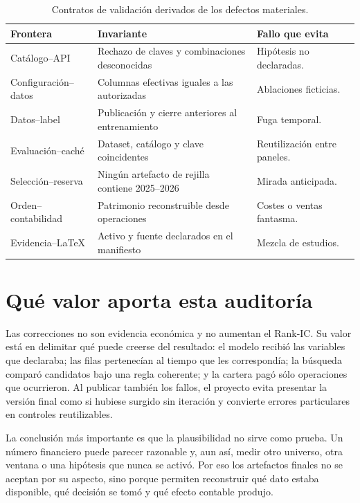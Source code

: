 \begin{table}[H]
  \centering
  \small
  \begin{tabularx}{\textwidth}{p{3.0cm}X X}
    \toprule
    Frontera & Invariante & Fallo que evita \\
    \midrule
    Catálogo--API & Rechazo de claves y combinaciones desconocidas & Hipótesis no declaradas. \\
    Configuración--datos & Columnas efectivas iguales a las autorizadas & Ablaciones ficticias. \\
    Datos--label & Publicación y cierre anteriores al entrenamiento & Fuga temporal. \\
    Evaluación--caché & Dataset, catálogo y clave coincidentes & Reutilización entre paneles. \\
    Selección--reserva & Ningún artefacto de rejilla contiene 2025--2026 & Mirada anticipada. \\
    Orden--contabilidad & Patrimonio reconstruible desde operaciones & Costes o ventas fantasma. \\
    Evidencia--LaTeX & Activo y fuente declarados en el manifiesto & Mezcla de estudios. \\
    \bottomrule
  \end{tabularx}
  \caption{Contratos de validación derivados de los defectos materiales.}
  \label{tab:contratos-validacion}
\end{table}

\section*{Qué valor aporta esta auditoría}

Las correcciones no son evidencia económica y no aumentan el Rank-IC. Su valor está en delimitar qué
puede creerse del resultado: el modelo recibió las variables que declaraba; las filas pertenecían al
tiempo que les correspondía; la búsqueda comparó candidatos bajo una regla coherente; y la cartera
pagó sólo operaciones que ocurrieron. Al publicar también los fallos, el proyecto evita presentar la
versión final como si hubiese surgido sin iteración y convierte errores particulares en controles
reutilizables.

La conclusión más importante es que la plausibilidad no sirve como prueba. Un número financiero
puede parecer razonable y, aun así, medir otro universo, otra ventana o una hipótesis que nunca se
activó. Por eso los artefactos finales no se aceptan por su aspecto, sino porque permiten reconstruir
qué dato estaba disponible, qué decisión se tomó y qué efecto contable produjo.
